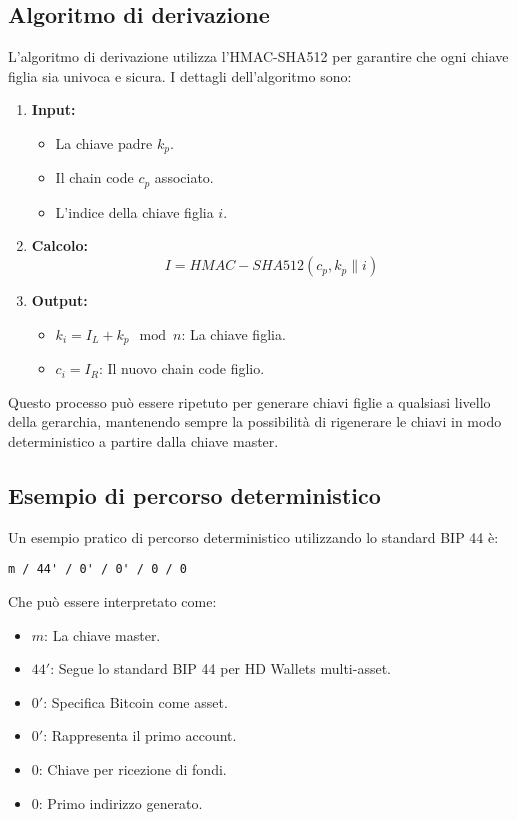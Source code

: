 \documentclass{article}
\begin{document}
\subsection{Algoritmo di derivazione}
L'algoritmo di derivazione utilizza l'HMAC-SHA512 per garantire che ogni chiave figlia sia univoca e sicura. I dettagli dell'algoritmo sono:
\begin{enumerate}
    \item \textbf{Input:}
    \begin{itemize}
        \item La chiave padre \(k_p\).
        \item Il chain code \(c_p\) associato.
        \item L'indice della chiave figlia \(i\).
    \end{itemize}
    \item \textbf{Calcolo:}
    \[
    I = HMAC-SHA512(c_p, k_p \parallel i)
    \]
    \item \textbf{Output:}
    \begin{itemize}
        \item \(k_i = I_L + k_p \mod n\): La chiave figlia.
        \item \(c_i = I_R\): Il nuovo chain code figlio.
    \end{itemize}
\end{enumerate}

Questo processo può essere ripetuto per generare chiavi figlie a qualsiasi livello della gerarchia, mantenendo sempre la possibilità di rigenerare le chiavi in modo deterministico a partire dalla chiave master.

\subsection{Esempio di percorso deterministico}
Un esempio pratico di percorso deterministico utilizzando lo standard BIP 44 è:
\begin{verbatim}
m / 44' / 0' / 0' / 0 / 0
\end{verbatim}
Che può essere interpretato come:
\begin{itemize}
    \item \(m\): La chiave master.\vspace{-0.5em}
    \item \(44'\): Segue lo standard BIP 44 per HD Wallets multi-asset.\vspace{-0.5em}
    \item \(0'\): Specifica Bitcoin come asset.\vspace{-0.5em}
    \item \(0'\): Rappresenta il primo account.\vspace{-0.5em}
    \item \(0\): Chiave per ricezione di fondi.\vspace{-0.5em}
    \item \(0\): Primo indirizzo generato.\vspace{-0.5em}
\end{itemize}
\end{document}
